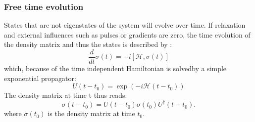         \subsubsection{Free time evolution}
        States that are not eigenstates of the system will evolve over time. If relaxation and external influences such as pulses or gradients are zero, the time evolution of the density matrix and thus the states is described by \cite{sakurai_modern_2017, levitt_spin_nodate}:
        \begin{equation}
            \frac{d}{dt} \sigma(t) = -i \left[\mathcal{H}, \sigma(t)\right]
        \end{equation}
        which, because of the time independent Hamiltonian is solvedby a simple exponential propagator:
        \begin{equation*}
            U(t-t_0) = \exp(-i\mathcal{H}(t-t_0))
        \end{equation*}
        The density matrix at time t thus reads:
        \begin{equation}
            \sigma(t-t_0) = U(t-t_0) \sigma(t_0) U^\dagger(t-t_0).
        \end{equation}
        where $\sigma(t_0)$ is the density matrix at time $t_0$.
